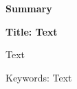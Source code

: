 \thispagestyle{empty}

\begin{center}
	\textbf{Summary}
\end{center}
\textbf{Title: Text}

Text

Keywords: Text